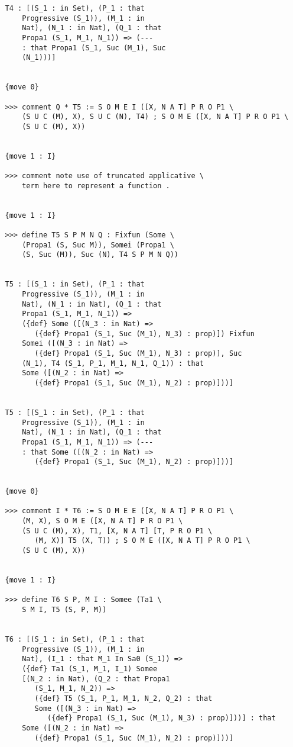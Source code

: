 \documentclass{article}
\begin{document}
\begin{verbatim}
   T4 : [(S_1 : in Set), (P_1 : that 
       Progressive (S_1)), (M_1 : in 
       Nat), (N_1 : in Nat), (Q_1 : that 
       Propa1 (S_1, M_1, N_1)) => (--- 
       : that Propa1 (S_1, Suc (M_1), Suc 
       (N_1)))]


   {move 0}

   >>> comment Q * T5 := S O M E I ([X, N A T] P R O P1 \
       (S U C (M), X), S U C (N), T4) ; S O M E ([X, N A T] P R O P1 \
       (S U C (M), X))


   {move 1 : I}

   >>> comment note use of truncated applicative \
       term here to represent a function .


   {move 1 : I}

   >>> define T5 S P M N Q : Fixfun (Some \
       (Propa1 (S, Suc M)), Somei (Propa1 \
       (S, Suc (M)), Suc (N), T4 S P M N Q))


   T5 : [(S_1 : in Set), (P_1 : that 
       Progressive (S_1)), (M_1 : in 
       Nat), (N_1 : in Nat), (Q_1 : that 
       Propa1 (S_1, M_1, N_1)) => 
       ({def} Some ([(N_3 : in Nat) => 
          ({def} Propa1 (S_1, Suc (M_1), N_3) : prop)]) Fixfun 
       Somei ([(N_3 : in Nat) => 
          ({def} Propa1 (S_1, Suc (M_1), N_3) : prop)], Suc 
       (N_1), T4 (S_1, P_1, M_1, N_1, Q_1)) : that 
       Some ([(N_2 : in Nat) => 
          ({def} Propa1 (S_1, Suc (M_1), N_2) : prop)]))]


   T5 : [(S_1 : in Set), (P_1 : that 
       Progressive (S_1)), (M_1 : in 
       Nat), (N_1 : in Nat), (Q_1 : that 
       Propa1 (S_1, M_1, N_1)) => (--- 
       : that Some ([(N_2 : in Nat) => 
          ({def} Propa1 (S_1, Suc (M_1), N_2) : prop)]))]


   {move 0}

   >>> comment I * T6 := S O M E E ([X, N A T] P R O P1 \
       (M, X), S O M E ([X, N A T] P R O P1 \
       (S U C (M), X), T1, [X, N A T] [T, P R O P1 \
          (M, X)] T5 (X, T)) ; S O M E ([X, N A T] P R O P1 \
       (S U C (M), X))


   {move 1 : I}

   >>> define T6 S P, M I : Somee (Ta1 \
       S M I, T5 (S, P, M))


   T6 : [(S_1 : in Set), (P_1 : that 
       Progressive (S_1)), (M_1 : in 
       Nat), (I_1 : that M_1 In Sa0 (S_1)) => 
       ({def} Ta1 (S_1, M_1, I_1) Somee 
       [(N_2 : in Nat), (Q_2 : that Propa1 
          (S_1, M_1, N_2)) => 
          ({def} T5 (S_1, P_1, M_1, N_2, Q_2) : that 
          Some ([(N_3 : in Nat) => 
             ({def} Propa1 (S_1, Suc (M_1), N_3) : prop)]))] : that 
       Some ([(N_2 : in Nat) => 
          ({def} Propa1 (S_1, Suc (M_1), N_2) : prop)]))]



\end{verbatim}
\end{document}
